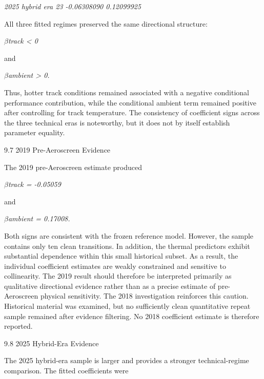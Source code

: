 \begin{center}\textit{2025 hybrid era         23 -0.06308090   0.12099925}\end{center}

All three fitted regimes preserved the same directional structure:

\begin{center}\textit{\ensuremath{\beta}track < 0}\end{center}

and

\begin{center}\textit{\ensuremath{\beta}ambient > 0.}\end{center}

Thus, hotter track conditions remained associated with a negative conditional performance contribution, while the conditional ambient term remained positive after controlling for track temperature. The consistency of coefficient signs across the three technical eras is noteworthy, but it does not by itself establish parameter equality.

9.7 2019 Pre-Aeroscreen Evidence

The 2019 pre-Aeroscreen estimate produced

\begin{center}\textit{\ensuremath{\beta}track = -0.05059}\end{center}

and

\begin{center}\textit{\ensuremath{\beta}ambient = 0.17008.}\end{center}

Both signs are consistent with the frozen reference model. However, the sample contains only ten clean transitions. In addition, the thermal predictors exhibit substantial dependence within this small historical subset. As a result, the individual coefficient estimates are weakly constrained and sensitive to collinearity. The 2019 result should therefore be interpreted primarily as qualitative directional evidence rather than as a precise estimate of pre-Aeroscreen physical sensitivity. The 2018 investigation reinforces this caution. Historical material was examined, but no sufficiently clean quantitative repeat sample remained after evidence filtering. No 2018 coefficient estimate is therefore reported.

9.8 2025 Hybrid-Era Evidence

The 2025 hybrid-era sample is larger and provides a stronger technical-regime comparison. The fitted coefficients were

